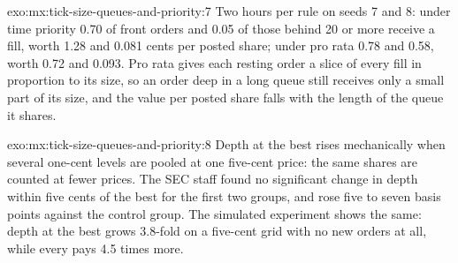\begin{solution}{exo:mx:tick-size-queues-and-priority:7}
Two hours per rule on seeds 7 and 8: under time priority 0.70 of front orders and 0.05 of those behind 20 or more receive a fill, worth 1.28 and 0.081 cents
per posted share; under pro rata 0.78 and 0.58, worth 0.72 and 0.093. Pro rata gives each resting order a slice of every fill in proportion to its size,
so an order deep in a long queue still receives only a small part of its size, and the value per posted share falls with the length of the queue it
shares.
\end{solution}

\begin{solution}{exo:mx:tick-size-queues-and-priority:8}
Depth at the best rises mechanically when several one-cent levels are pooled at one five-cent price: the same shares are counted at fewer prices. The
SEC staff found no significant change in depth within five cents of the best for the first two groups, and  rose five to seven basis
points against the control group. The simulated experiment shows the same: depth at the best grows 3.8-fold on a five-cent grid with no new orders at
all, while every  pays 4.5 times more.
\end{solution}

